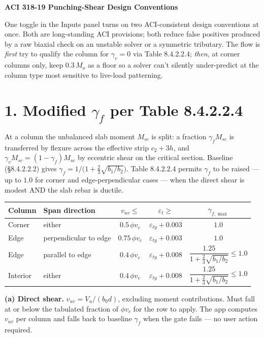 \documentclass[10pt]{article}
\begin{document}
\begin{center}{\large\bfseries ACI 318-19 Punching-Shear Design Conventions}\end{center}

One toggle in the Inputs panel turns on two ACI-consistent design conventions at once. Both are long-standing ACI provisions; both reduce false positives produced by a raw biaxial check on an unstable solver or a symmetric tributary. The flow is \textit{first} try to qualify the column for $\gamma_v = 0$ via Table 8.4.2.2.4; \textit{then}, at corner columns only, keep $0.3\,M_o$ as a floor so a solver can't silently under-predict at the column type most sensitive to live-load patterning.

\section*{1. Modified $\gamma_f$ per Table 8.4.2.2.4}
At a column the unbalanced slab moment $M_{sc}$ is split: a fraction $\gamma_f M_{sc}$ is transferred by flexure across the effective strip $c_2 + 3h$, and $\gamma_v M_{sc} = (1-\gamma_f) M_{sc}$ by eccentric shear on the critical section. Baseline (\S 8.4.2.2.2) gives $\gamma_f = 1/\bigl(1 + \tfrac{2}{3}\sqrt{b_1/b_2}\bigr)$. Table 8.4.2.2.4 permits $\gamma_f$ to be raised --- up to $1.0$ for corner and edge-perpendicular cases --- when the direct shear is modest AND the slab rebar is ductile.

\begin{tabular}{|l|l|c|c|c|}
\hline
\textbf{Column} & \textbf{Span direction} & $v_{uv} \leq$ & $\varepsilon_t \geq$ & $\gamma_{f,\max}$ \\
\hline
Corner          & either                   & $0.5\,\phi v_c$   & $\varepsilon_{ty} + 0.003$ & $1.0$ \\
Edge            & perpendicular to edge    & $0.75\,\phi v_c$  & $\varepsilon_{ty} + 0.003$ & $1.0$ \\
Edge            & parallel to edge         & $0.4\,\phi v_c$   & $\varepsilon_{ty} + 0.008$ & $\dfrac{1.25}{1 + \tfrac{2}{3}\sqrt{b_1/b_2}} \leq 1.0$ \\
Interior        & either                   & $0.4\,\phi v_c$   & $\varepsilon_{ty} + 0.008$ & $\dfrac{1.25}{1 + \tfrac{2}{3}\sqrt{b_1/b_2}} \leq 1.0$ \\
\hline
\end{tabular}

\vspace{3pt}

\noindent\textbf{(a) Direct shear.} $v_{uv} = V_u / (b_0 d)$, excluding moment contributions. Must fall at or below the tabulated fraction of $\phi v_c$ for the row to apply. The app computes $v_{uv}$ per column and falls back to baseline $\gamma_f$ when the gate fails --- no user action required.
\end{document}
